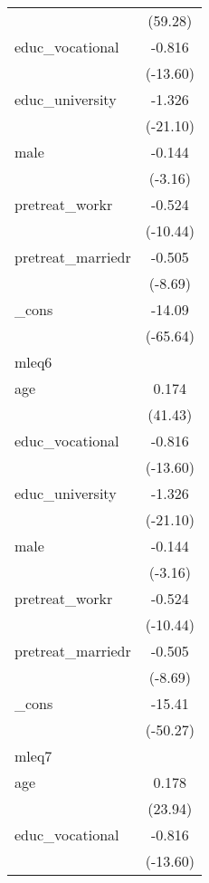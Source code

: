 {\begin{tabular}{l*{1}{c}}
            &     (59.28)         \\
[1em]
educ\_vocational&      -0.816\sym{***}\\
            &    (-13.60)         \\
[1em]
educ\_university&      -1.326\sym{***}\\
            &    (-21.10)         \\
[1em]
male        &      -0.144\sym{**} \\
            &     (-3.16)         \\
[1em]
pretreat\_workr&      -0.524\sym{***}\\
            &    (-10.44)         \\
[1em]
pretreat\_marriedr&      -0.505\sym{***}\\
            &     (-8.69)         \\
[1em]
\_cons      &      -14.09\sym{***}\\
            &    (-65.64)         \\
\hline
mleq6       &                     \\
age         &       0.174\sym{***}\\
            &     (41.43)         \\
[1em]
educ\_vocational&      -0.816\sym{***}\\
            &    (-13.60)         \\
[1em]
educ\_university&      -1.326\sym{***}\\
            &    (-21.10)         \\
[1em]
male        &      -0.144\sym{**} \\
            &     (-3.16)         \\
[1em]
pretreat\_workr&      -0.524\sym{***}\\
            &    (-10.44)         \\
[1em]
pretreat\_marriedr&      -0.505\sym{***}\\
            &     (-8.69)         \\
[1em]
\_cons      &      -15.41\sym{***}\\
            &    (-50.27)         \\
\hline
mleq7       &                     \\
age         &       0.178\sym{***}\\
            &     (23.94)         \\
[1em]
educ\_vocational&      -0.816\sym{***}\\
            &    (-13.60)         \\

\end{tabular}}

